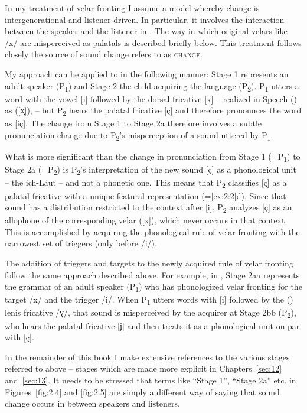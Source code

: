 \begin{xlist}
\begin{xlist}
In my treatment of velar fronting I assume a model whereby change is intergenerational and listener-driven. In particular, it involves the interaction between the speaker and the listener in . The way in which original velars like /x/ are misperceived as palatals is described briefly below. This treatment follows closely the source of sound change \citet[32--34]{Blevins2004} refers to as \textsc{change}.

My approach can be applied to  in the following manner: Stage 1 represents an adult speaker (P\textsubscript{1}) and Stage 2 the child acquiring the language (P\textsubscript{2}). P\textsubscript{1} utters a word with the vowel [i] followed by the dorsal fricative [x] -- realized in Speech () as  ([x̟]), --  but P\textsubscript{2} hears the palatal fricative [ç] and therefore pronounces the word as [iç]. The change from Stage 1 to Stage 2a therefore involves a subtle pronunciation change due to P\textsubscript{2}’s misperception of a sound uttered by P\textsubscript{1}.

What is more significant than the change in pronunciation from Stage 1 (=P\textsubscript{1}) to Stage 2a (=P\textsubscript{2}) is P\textsubscript{2}’s interpretation of the new sound [ç] as a phonological unit -- the ich-Laut -- and not a phonetic one. This means that P\textsubscript{2} classifies [ç] as a palatal fricative with a unique featural representation  (=\ref{ex:2:2}d). Since that sound has a distribution restricted to the context after [i], P\textsubscript{2} analyzes [ç] as an allophone of the corresponding velar ([x]), which never occurs in that context. This is accomplished by acquiring the phonological rule of velar fronting with the narrowest set of triggers (only before /i/).

The addition of triggers and targets to the newly acquired rule of velar fronting follow the same approach described above. For example, in , Stage 2aa represents the grammar of an adult speaker (P\textsubscript{1}) who has phonologized velar fronting for the target /x/ and the trigger /i/. When P\textsubscript{1} utters words with [i] followed by the () lenis fricative /ɣ/, that sound is misperceived by the acquirer at Stage 2bb (P\textsubscript{2}), who hears the palatal fricative [ʝ] and then treats it as a phonological unit on par with [ç].

In the remainder of this book I make extensive references to the various stages referred to above -- stages which are made more explicit in Chapters~\ref{sec:12} and~\ref{sec:13}. It needs to be stressed that terms like “Stage 1”, “Stage 2a” etc. in Figures~\ref{fig:2.4} and \ref{fig:2.5} are simply a different way of saying that sound change occurs in  between speakers and listeners.


\end{xlist}
\end{xlist}
